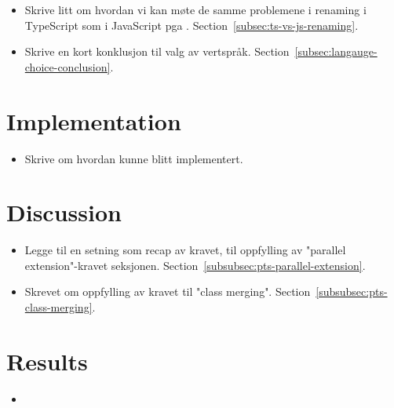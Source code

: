 \begin{itemize}
    \item Skrive litt om hvordan vi kan møte de samme problemene i renaming i TypeScript som i JavaScript pga .
    Section~\vref{subsec:ts-vs-js-renaming}.
    \item Skrive en kort konklusjon til valg av vertspråk.
    Section~\vref{subsec:langauge-choice-conclusion}.
\end{itemize}

\section*{Implementation}

\begin{itemize}
    \item Skrive om hvordan  kunne blitt implementert.
\end{itemize}

\section*{Discussion}

\begin{itemize}
    \item Legge til en setning som recap av kravet, til oppfylling av "parallel extension"-kravet seksjonen.
    Section~\vref{subsubsec:pts-parallel-extension}.
    \item Skrevet om oppfylling av kravet til "class merging".
    Section~\vref{subsubsec:pts-class-merging}.
\end{itemize}

\section*{Results}

\begin{itemize}
    \item
\end{itemize}
